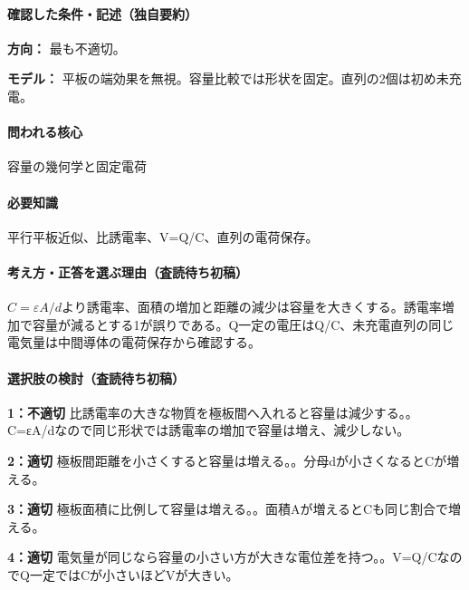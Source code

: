 \paragraph{確認した条件・記述（独自要約）}\mbox{}\par

\noindent\textbf{方向：} 最も不適切。\par

\noindent\textbf{モデル：} 平板の端効果を無視。容量比較では形状を固定。直列の2個は初め未充電。\par

\paragraph{問われる核心} 容量の幾何学と固定電荷

\paragraph{必要知識} 平行平板近似、比誘電率、V=\allowbreak{}Q/C、直列の電荷保存。

\paragraph{考え方・正答を選ぶ理由（査読待ち初稿）} \(C=\varepsilon A/d\)より誘電率、面積の増加と距離の減少は容量を大きくする。誘電率増加で容量が減るとする1が誤りである。Q一定の電圧はQ/C、未充電直列の同じ電気量は中間導体の電荷保存から確認する。

\paragraph{選択肢の検討（査読待ち初稿）}\mbox{}\par

\noindent\textbf{1：不適切} 比誘電率の大きな物質を極板間へ入れると容量は減少する。。C=εA/dなので同じ形状では誘電率の増加で容量は増え、減少しない。\par

\noindent\textbf{2：適切} 極板間距離を小さくすると容量は増える。。分母dが小さくなるとCが増える。\par

\noindent\textbf{3：適切} 極板面積に比例して容量は増える。。面積Aが増えるとCも同じ割合で増える。\par

\noindent\textbf{4：適切} 電気量が同じなら容量の小さい方が大きな電位差を持つ。。V=\allowbreak{}Q/CなのでQ一定ではCが小さいほどVが大きい。\par

